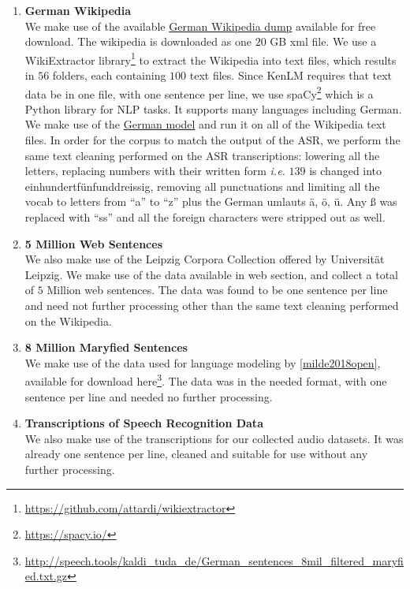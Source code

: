 \begin{enumerate}
	\item \textbf{German Wikipedia} \\
	We make use of the available \href{https://dumps.wikimedia.org/dewiki/latest/}{German Wikipedia dump} available for free download. The wikipedia is downloaded as one $20$ GB xml file. We use a WikiExtractor library\footnote{\url{https://github.com/attardi/wikiextractor}} to extract the Wikipedia into text files, which results in $56$ folders, each containing $100$ text files. Since KenLM requires that text data be in one file, with one sentence per line, we use spaCy\footnote{\url{https://spacy.io/}} which is a Python library for \ac{NLP} tasks. It supports many languages including German. We make use of the \href{https://spacy.io/models/de}{German model} and run it on all of the Wikipedia text files. In order for the corpus to match the output of the \ac{ASR}, we perform the same text cleaning performed on the \ac{ASR} transcriptions: lowering all the letters, replacing numbers with their written form \textit{i.e.} $139$ is changed into einhundertf{\"u}nfunddreissig, removing all punctuations and limiting all the vocab to letters from \enquote{a} to \enquote{z} plus the German umlauts {\"a}, {\"o}, {\"u}. Any {\ss} was replaced with \enquote{ss} and all the foreign characters were stripped out as well.
	
	
	
	\item \textbf{5 Million Web Sentences} \\
	We also make use of the Leipzig Corpora Collection offered by Universit{\"a}t Leipzig. We make use of the data available in web section, and collect a total of $5$ Million web sentences. The data was found to be one sentence per line and need not further processing other than the same text cleaning performed on the Wikipedia.
	
	
	\item \textbf{8 Million Maryfied Sentences} \\
	We make use of the data used for language modeling by \ref{milde2018open}, available for download here\footnote{\url{ http://speech.tools/kaldi_tuda_de/German_sentences_8mil_filtered_maryfied.txt.gz}}. The data was in the needed format, with one sentence per line and needed no further processing.
	
	
	\item \textbf{Transcriptions of Speech Recognition Data} \\
	We also make use of the transcriptions for our collected audio datasets. It was already one sentence per line, cleaned and suitable for use without any further processing.

	
\end{enumerate}


